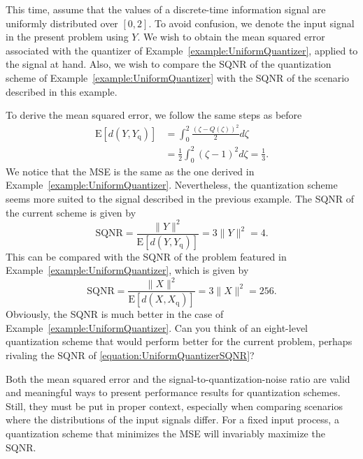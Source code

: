 \begin{example}
This time, assume that the values of a discrete-time information signal are uniformly distributed over $[0,2]$.
To avoid confusion, we denote the input signal in the present problem using $Y$.
We wish to obtain the mean squared error associated with the quantizer of Example~\ref{example:UniformQuantizer}, applied to the signal at hand.
Also, we wish to compare the SQNR of the quantization scheme of Example~\ref{example:UniformQuantizer} with the SQNR of the scenario described in this example.

To derive the mean squared error, we follow the same steps as before
\begin{equation*}
\begin{split}
\mathrm{E} [ d(Y, Y_{\mathrm{q}}) ]
&= \int_0^{2} \frac{(\zeta - Q(\zeta))^2}{2} d\zeta \\
&= \frac{1}{2} \int_{0}^{2} (\zeta - 1)^2 d\zeta = \frac{1}{3} .
\end{split}
\end{equation*}
We notice that the MSE is the same as the one derived in Example~\ref{example:UniformQuantizer}.
Nevertheless, the quantization scheme seems more suited to the signal described in the previous example.
The SQNR of the current scheme is given by
\begin{equation*}
\text{SQNR} = \frac{\| Y \|^2}{\mathrm{E} [ d(Y, Y_{\mathrm{q}}) ]}
= 3 \| Y \|^2 = 4.
\end{equation*}
This can be compared with the SQNR of the problem featured in Example~\ref{example:UniformQuantizer}, which is given by
\begin{equation} \label{equation:UniformQuantizerSQNR}
\text{SQNR} = \frac{\| X \|^2}{\mathrm{E} [ d(X, X_{\mathrm{q}}) ]}
= 3 \| X \|^2 = 256.
\end{equation}
Obviously, the SQNR is much better in the case of Example~\ref{example:UniformQuantizer}.
Can you think of an eight-level quantization scheme that would perform better for the current problem, perhaps rivaling the SQNR of \eqref{equation:UniformQuantizerSQNR}?
\end{example}

Both the mean squared error and the signal-to-quantization-noise ratio are valid and meaningful ways to present performance results for quantization schemes.
Still, they must be put in proper context, especially when comparing scenarios where the distributions of the input signals differ.
For a fixed input process, a quantization scheme that minimizes the MSE will invariably maximize the SQNR.


